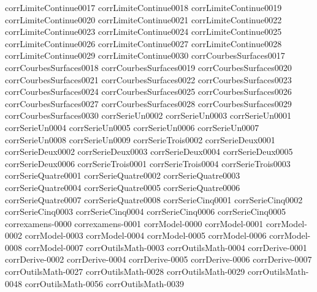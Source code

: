 {corrLimiteContinue0017}
{corrLimiteContinue0018}
{corrLimiteContinue0019}
{corrLimiteContinue0020}
{corrLimiteContinue0021}
{corrLimiteContinue0022}
{corrLimiteContinue0023}
{corrLimiteContinue0024}
{corrLimiteContinue0025}
{corrLimiteContinue0026}
{corrLimiteContinue0027}
{corrLimiteContinue0028}
{corrLimiteContinue0029}
{corrLimiteContinue0030}
{corrCourbesSurfaces0017}
{corrCourbesSurfaces0018}
{corrCourbesSurfaces0019}
{corrCourbesSurfaces0020}
{corrCourbesSurfaces0021}
{corrCourbesSurfaces0022}
{corrCourbesSurfaces0023}
{corrCourbesSurfaces0024}
{corrCourbesSurfaces0025}
{corrCourbesSurfaces0026}
{corrCourbesSurfaces0027}
{corrCourbesSurfaces0028}
{corrCourbesSurfaces0029}
{corrCourbesSurfaces0030}
{corrSerieUn0002}
{corrSerieUn0003}
{corrSerieUn0001}
{corrSerieUn0004}
{corrSerieUn0005}
{corrSerieUn0006}
{corrSerieUn0007}
{corrSerieUn0008}
{corrSerieUn0009}
{corrSerieTrois0002}
{corrSerieDeux0001}
{corrSerieDeux0002}
{corrSerieDeux0003}
{corrSerieDeux0004}
{corrSerieDeux0005}
{corrSerieDeux0006}
{corrSerieTrois0001}
{corrSerieTrois0004}
{corrSerieTrois0003}
{corrSerieQuatre0001}
{corrSerieQuatre0002}
{corrSerieQuatre0003}
{corrSerieQuatre0004}
{corrSerieQuatre0005}
{corrSerieQuatre0006}
{corrSerieQuatre0007}
{corrSerieQuatre0008}
{corrSerieCinq0001}
{corrSerieCinq0002}
{corrSerieCinq0003}
{corrSerieCinq0004}
{corrSerieCinq0006}
{corrSerieCinq0005}
{correxamens-0000}
{correxamens-0001}
{corrModel-0000}
{corrModel-0001}
{corrModel-0002}
{corrModel-0003}
{corrModel-0004}
{corrModel-0005}
{corrModel-0006}
{corrModel-0008}
{corrModel-0007}
{corrOutilsMath-0003}
{corrOutilsMath-0004}
{corrDerive-0001}
{corrDerive-0002}
{corrDerive-0004}
{corrDerive-0005}
{corrDerive-0006}
{corrDerive-0007}
{corrOutilsMath-0027}
{corrOutilsMath-0028}
{corrOutilsMath-0029}
{corrOutilsMath-0048}
{corrOutilsMath-0056}
{corrOutilsMath-0039}
